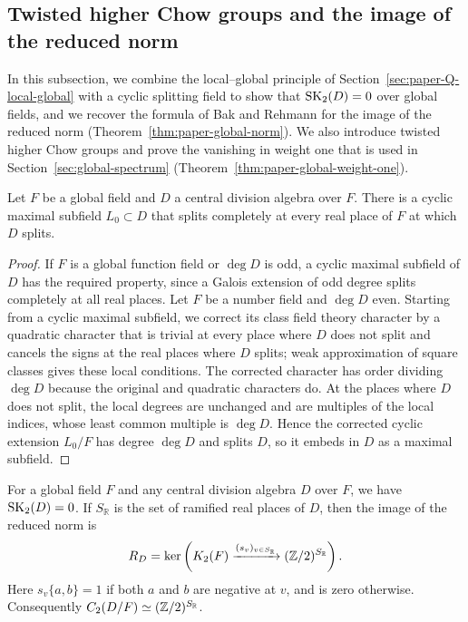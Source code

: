 \subsection{Twisted higher Chow groups and the image of the reduced norm}\label{sec:paper-global-weight-one}
In this subsection, we combine the local--global principle of Section~\ref{sec:paper-Q-local-global} with a cyclic splitting field to show that $\operatorname{SK}_2(D)=0$ over global fields, and we recover the formula of Bak and Rehmann \cite[\S2, Theorem 3]{BakRehmann1984} for the image of the reduced norm (Theorem~\ref{thm:paper-global-norm}).
We also introduce twisted higher Chow groups and prove the vanishing in weight one that is used in Section~\ref{sec:global-spectrum} (Theorem~\ref{thm:paper-global-weight-one}).


\begin{lemma}\label{lem:paper-cyclic-real-split}
Let $F$ be a global field and $D$ a central division algebra over $F$.
There is a cyclic maximal subfield $L_0\subset D$ that splits completely at every real place of $F$ at which $D$ splits.
\end{lemma}
\begin{proof}
If $F$ is a global function field or $\deg D$ is odd, a cyclic maximal subfield of $D$ has the required property, since a Galois extension of odd degree splits completely at all real places.
Let $F$ be a number field and $\deg D$ even.
Starting from a cyclic maximal subfield, we correct its class field theory character by a quadratic character that is trivial at every place where $D$ does not split and cancels the signs at the real places where $D$ splits; weak approximation of square classes gives these local conditions.
The corrected character has order dividing $\deg D$ because the original and quadratic characters do.
At the places where $D$ does not split, the local degrees are unchanged and are multiples of the local indices, whose least common multiple is $\deg D$.
Hence the corrected cyclic extension $L_0/F$ has degree $\deg D$ and splits $D$, so it embeds in $D$ as a maximal subfield.
\end{proof}

\begin{theorem}\label{thm:paper-global-norm}
For a global field $F$ and any central division algebra $D$ over $F$, we have $\operatorname{SK}_2(D)=0$.
If $S_{\mathbb R}$ is the set of ramified real places of $D$, then the image of the reduced norm is
\[
 R_D=\ker\left(K_2(F)\xrightarrow{(s_v)_{v\in S_{\mathbb R}}}
                        (\mathbb Z/2)^{S_{\mathbb R}}\right).
\]
Here $s_v\{a,b\}=1$ if both $a$ and $b$ are negative at $v$, and is zero otherwise.
Consequently $C_2(D/F)\simeq(\mathbb Z/2)^{S_{\mathbb R}}$.
\end{theorem}


